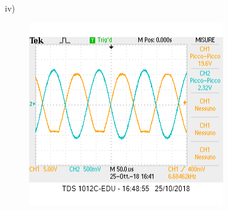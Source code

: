 \documentclass[10pt,a4paper]{article}
\begin{document}
iv)\begin{figure}[h]
	\centering
	\includegraphics[scale=0.5]{clipping.png}
\end{figure}
\end{document}
